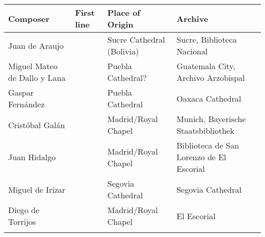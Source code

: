\documentclass[table]{vcbook-float}
\begin{document}
\begin{tabulary}{\textwidth}{lLlL}
    \toprule

    Composer
    & First line
    & Place of Origin
    & Archive\\
    \midrule

    Juan de Araujo
    & 
    & Sucre Cathedral (Bolivia)
    & Sucre, Biblioteca Nacional \\

    Miguel Mateo de Dallo y Lana 
    & 
    & Puebla Cathedral?
    & Guatemala City, Archivo Arzobispal \\ %

    Gaspar Fernández
    & 
    & Puebla Cathedral 
    & Oaxaca Cathedral \\ %

    Cristóbal Galán
    & 
    & Madrid/Royal Chapel
    & Munich, Bayerische Staatsbibliothek \\ %

    Juan Hidalgo
    & 
    & Madrid/Royal Chapel
    & Biblioteca de San Lorenzo de El Escorial \\ %
    
    Miguel de Irízar
    & 
    & Segovia Cathedral
    & Segovia Cathedral \\ %

    Diego de Torrijos 
    & 
    & Madrid/Royal Chapel
    & El Escorial \\ %
    \bottomorule
\end{tabulary}
\end{document}
